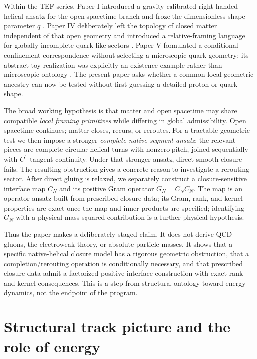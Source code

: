\documentclass[10pt]{article}
\begin{document}
Within the TEF series, Paper I introduced a gravity-calibrated right-handed helical ansatz for the open-spacetime branch and froze the dimensionless shape parameter $q$ \cite{WuWeakMixing}. Paper IV deliberately left the topology of closed matter independent of that open geometry and introduced a relative-framing language for globally incomplete quark-like sectors \cite{WuMatterSpace}. Paper V formulated a conditional confinement correspondence without selecting a microscopic quark geometry; its abstract toy realization was explicitly an existence example rather than microscopic ontology \cite{WuConfinement}. The present paper asks whether a common local geometric ancestry can now be tested without first guessing a detailed proton or quark shape.

The broad working hypothesis is that matter and open spacetime may share compatible \emph{local framing primitives} while differing in global admissibility. Open spacetime continues; matter closes, recurs, or reroutes. For a tractable geometric test we then impose a stronger \emph{complete-native-segment ansatz}: the relevant pieces are complete circular helical turns with nonzero pitch, joined sequentially with $C^1$ tangent continuity. Under that stronger ansatz, direct smooth closure fails. The resulting obstruction gives a concrete reason to investigate a rerouting sector. After direct gluing is relaxed, we separately construct a closure-sensitive interface map $C_N$ and its positive Gram operator $G_N=C_N^\dagger C_N$. The map is an operator ansatz built from prescribed closure data; its Gram, rank, and kernel properties are exact once the map and inner products are specified; identifying $G_N$ with a physical mass-squared contribution is a further physical hypothesis.

Thus the paper makes a deliberately staged claim. It does not derive QCD gluons, the electroweak theory, or absolute particle masses. It shows that a specific native-helical closure model has a rigorous geometric obstruction, that a completion/rerouting operation is conditionally necessary, and that prescribed closure data admit a factorized positive interface construction with exact rank and kernel consequences. This is a step from structural ontology toward energy dynamics, not the endpoint of the program.

\section{Structural track picture and the role of energy}
\label{sec:trackenergy}
\end{document}
